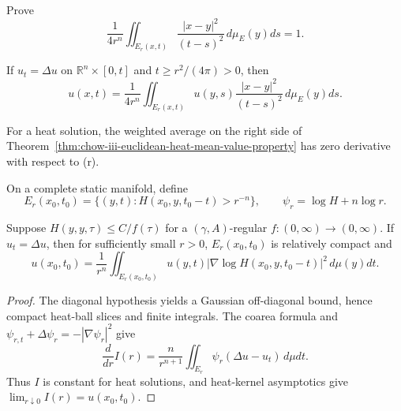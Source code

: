 \begin{claim}
\label{clm:chow-iii-euclidean-heat-ball-normalization-exercise}
Prove
\[
 \frac1{4r^n}\iint_{E_r(x,t)}\frac{|x-y|^2}{(t-s)^2}
 \,d\mu_E(y)ds=1.
\]
\end{claim}

\begin{theorem}
\label{thm:chow-iii-euclidean-heat-mean-value-property}
If \(u_t=\Delta u\) on \(\mathbb R^n\times[0,t]\) and
\(t\ge r^2/(4\pi)>0\), then
\[
 u(x,t)=\frac1{4r^n}\iint_{E_r(x,t)}u(y,s)
 \frac{|x-y|^2}{(t-s)^2}\,d\mu_E(y)ds.
\]
\end{theorem}

\begin{lemma}
\label{lem:chow-iii-euclidean-heat-ball-average-stationary}
For a heat solution, the weighted average on the right side of
Theorem~\ref{thm:chow-iii-euclidean-heat-mean-value-property} has zero
derivative with respect to (r).
\end{lemma}

On a complete static manifold, define
\[
 E_r(x_0,t_0)=\{(y,t):H(x_0,y,t_0-t)>r^{-n}\},
 \qquad \psi_r=\log H+n\log r.
\]

\begin{theorem}
\label{thm:chow-iii-riemannian-heat-mean-value-property}
Suppose \(H(y,y,\tau)\le C/f(\tau)\) for a \((\gamma,A)\)-regular
\(f:(0,\infty)\to(0,\infty)\).  If \(u_t=\Delta u\), then for sufficiently
small \(r>0\), \(E_r(x_0,t_0)\) is relatively compact and
\[
 u(x_0,t_0)=\frac1{r^n}\iint_{E_r(x_0,t_0)}u(y,t)
 |\nabla\log H(x_0,y,t_0-t)|^2\,d\mu(y)dt.
\]
\end{theorem}
\begin{proof}
The diagonal hypothesis yields a Gaussian off-diagonal bound, hence compact
heat-ball slices and finite integrals.  The coarea formula and
\(\psi_{r,t}+\Delta\psi_r=-|\nabla\psi_r|^2\) give
\[
 \frac d{dr}I(r)=\frac n{r^{n+1}}\iint_{E_r}\psi_r(\Delta u-u_t)\,d\mu dt.
\]
Thus \(I\) is constant for heat solutions, and heat-kernel asymptotics give
\(\lim_{r\downarrow0}I(r)=u(x_0,t_0)\).
\end{proof}

